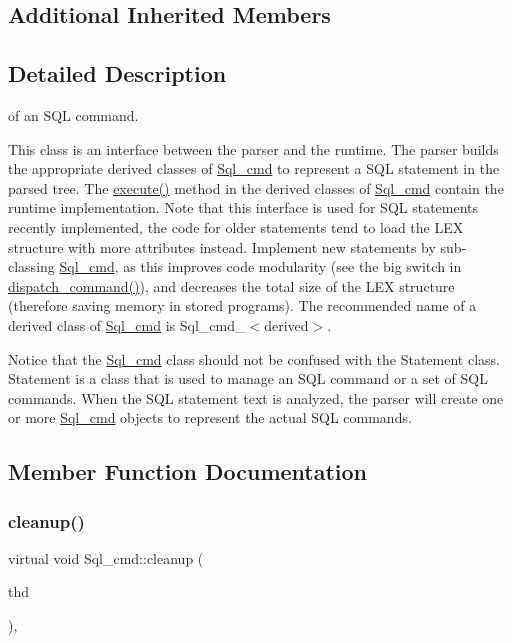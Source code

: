 \subsection*{Additional Inherited Members}


\subsection{Detailed Description}
of an S\+QL command.

This class is an interface between the parser and the runtime. The parser builds the appropriate derived classes of \mbox{\hyperlink{classSql__cmd}{Sql\+\_\+cmd}} to represent a S\+QL statement in the parsed tree. The \mbox{\hyperlink{classSql__cmd_a213367b79b551296fbb7790f2a3732fb}{execute()}} method in the derived classes of \mbox{\hyperlink{classSql__cmd}{Sql\+\_\+cmd}} contain the runtime implementation. Note that this interface is used for S\+QL statements recently implemented, the code for older statements tend to load the L\+EX structure with more attributes instead. Implement new statements by sub-\/classing \mbox{\hyperlink{classSql__cmd}{Sql\+\_\+cmd}}, as this improves code modularity (see the \textquotesingle{}big switch\textquotesingle{} in \mbox{\hyperlink{group__Runtime__Environment_gabf07206792036bfb47e5bb8eb0f20bc4}{dispatch\+\_\+command()}}), and decreases the total size of the L\+EX structure (therefore saving memory in stored programs). The recommended name of a derived class of \mbox{\hyperlink{classSql__cmd}{Sql\+\_\+cmd}} is Sql\+\_\+cmd\+\_\+$<$derived$>$.

Notice that the \mbox{\hyperlink{classSql__cmd}{Sql\+\_\+cmd}} class should not be confused with the Statement class. Statement is a class that is used to manage an S\+QL command or a set of S\+QL commands. When the S\+QL statement text is analyzed, the parser will create one or more \mbox{\hyperlink{classSql__cmd}{Sql\+\_\+cmd}} objects to represent the actual S\+QL commands. 

\subsection{Member Function Documentation}
\mbox{\label{classSql__cmd_a57dad9cab4d6349656cf38a03131b58a}} 
\subsubsection{\texorpdfstring{cleanup()}{cleanup()}}
{\footnotesize\ttfamily virtual void Sql\+\_\+cmd\+::cleanup (\begin{DoxyParamCaption}\item[{T\+HD $\ast$}]{thd }\end{DoxyParamCaption})\hspace{0.3cm}{\ttfamily [inline]}, {\ttfamily [virtual]}}

